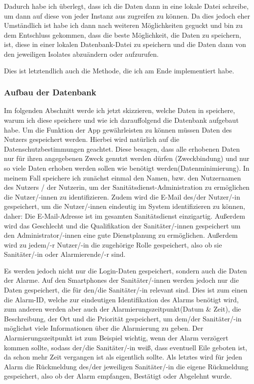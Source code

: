     Dadurch habe ich überlegt, dass ich die Daten dann in eine lokale Datei schreibe, um dann 
    auf diese von jeder Instanz aus zugreifen zu können. Da dies jedoch eher Umständlich ist habe 
    ich dann nach weiteren Möglichkeiten geguckt und bin zu dem Entschluss gekommen, dass die 
    beste Möglichkeit, die Daten zu speichern, ist, diese in einer lokalen Datenbank-Datei zu 
    speichern und die Daten dann von den jeweiligen Isolates abzuändern oder aufzurufen.

    Dies ist letztendlich auch die Methode, die ich am Ende implementiert habe.
\subsubsection{Aufbau der Datenbank}

    Im folgenden Abschnitt werde ich jetzt skizzieren, welche Daten in speichere, warum ich 
    diese speichere und wie ich darauffolgend die Datenbank aufgebaut habe. Um die Funktion der 
    App gewährleisten zu können müssen Daten des Nutzers gespeichert werden. Hierbei wird 
    natürlich auf die Datenschutzbestimmungen geachtet. Diese besagen, dass alle erhobenen Daten 
    nur für ihren angegebenen Zweck genutzt werden dürfen (Zweckbindung) und nur so viele Daten 
    erhoben werden sollen wie benötigt werden(Datenminimierung)\cite{DSGVO}. In meinem Fall 
    speichere ich zunächst einmal den Namen, bzw. den Nutzernamen des Nutzers / der Nutzerin, 
    um der Sanitätsdienst-Administration zu ermöglichen die Nutzer/-innen zu identifizieren.
    Zudem wird die E-Mail des/der Nutzer/-in gespeichert, um die Nutzer/-innen eindeutig im 
    System identifizieren zu können, daher: Die E-Mail-Adresse ist im gesamten Sanitätsdienst 
    einzigartig. Außerdem wird das Geschlecht und die Qualifikation der Sanitäter/-innen 
    gespeichert um den Administrator/-innen eine gute Dienstplanung zu ermöglichen.
    Außerdem wird zu jedem/-r Nutzer/-in die zugehörige Rolle gespeichert, also ob sie 
    Sanitäter/-in oder Alarmierende/-r sind.
    
    Es werden jedoch nicht nur die Login-Daten gespeichert, sondern auch die Daten der 
    Alarme. Auf den Smartphones der Sanitäter/-innen werden jedoch nur die Daten gespeichert, die 
    für den/die Sanitäter/-in relevant sind. Dies ist zum einen die Alarm-ID, welche zur 
    eindeutigen Identifikation des Alarms benötigt wird, zum anderen werden aber auch der 
    Alarmierungszeitpunkt(Datum \& Zeit), die Beschreibung, der Ort und die Priorität gespeichert,
    um dem/der Sanitäter/-in möglichst viele Informationen über die Alarmierung zu geben. Der 
    Alarmierungszeitpunkt ist zum Beispiel wichtig, wenn der Alarm verzögert kommen sollte, 
    sodass der/die Sanitäter/-in weiß, dass eventuell Eile geboten ist, da schon mehr Zeit 
    vergangen ist als eigentlich sollte. Als letztes wird für jeden Alarm die Rückmeldung des/der 
    jeweiligen Sanitäter/-in die eigene Rückmeldung gespeichert, also ob der Alarm empfangen, 
    Bestätigt oder Abgelehnt wurde.

